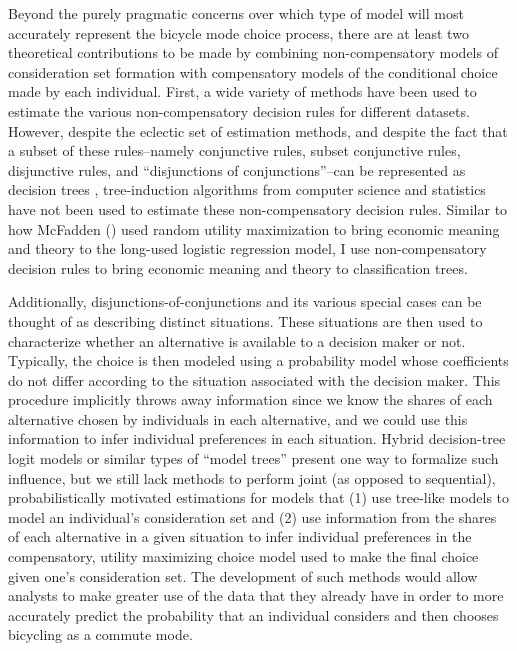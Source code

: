 Beyond the purely pragmatic concerns over which type of model will most accurately represent the bicycle mode choice process, there are at least two theoretical contributions to be made by combining non-compensatory models of consideration set formation with compensatory models of the conditional choice made by each individual.  First, a wide variety of methods have been used to estimate the various non-compensatory decision rules for different datasets. However, despite the eclectic set of estimation methods, and despite the fact that a subset of these rules--namely conjunctive rules, subset conjunctive rules, disjunctive rules, and ``disjunctions of conjunctions''--can be represented as decision trees \citep{hauser_disjunctions_2010}, tree-induction algorithms from computer science and statistics have not been used to estimate these non-compensatory decision rules.  Similar to how McFadden (\citeyear{mcfadden_conditional_1972}) used random utility maximization to bring economic meaning and theory to the long-used logistic regression model, I use non-compensatory decision rules to bring economic meaning and theory to classification trees.

Additionally, disjunctions-of-conjunctions and its various special cases can be thought of as describing distinct situations. These situations are then used to characterize whether an alternative is available to a decision maker or not. Typically, the choice is then modeled using a probability model whose coefficients do not differ according to the situation associated with the decision maker. This procedure implicitly throws away information since we know the shares of each alternative chosen by individuals in each alternative, and we could use this information to infer individual preferences in each situation. Hybrid decision-tree logit models \citep{steinberg_hybrid_1998} or similar types of ``model trees'' present one way to formalize such influence, but we still lack methods to perform joint (as opposed to sequential), probabilistically motivated estimations for models that (1) use tree-like models to model an individual's consideration set and (2) use information from the shares of each alternative in a given situation to infer individual preferences in the compensatory, utility maximizing choice model used to make the final choice given one's consideration set. The development of such methods would allow analysts to make greater use of the data that they already have in order to more accurately predict the probability that an individual considers and then chooses bicycling as a commute mode.

